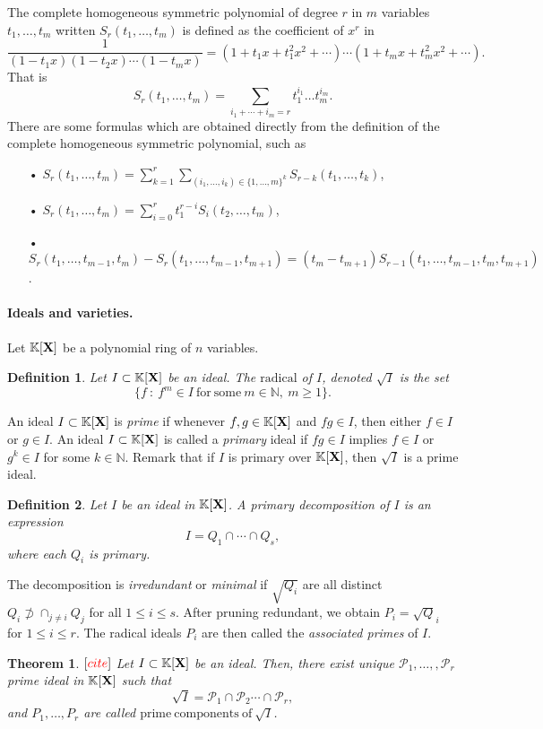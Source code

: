 \documentclass[11pt]{article}
\numberwithin{Property}{section}
\newtheorem{Theorem}{Theorem}%
\numberwithin{Theorem}{section}
\numberwithin{Proposition}{section}
\numberwithin{Lemma}{section}
\numberwithin{Corollary}{section}
\newtheorem{Definition}{Definition}%
\numberwithin{Definition}{section}
\numberwithin{Remark}{section}
\numberwithin{Conjecture}{section}
\numberwithin{Problem}{section}
\numberwithin{Claim}{section}
\theoremstyle{definition}
\numberwithin{Example}{section}
\renewcommand{\leq}{\leqslant}
\renewcommand{\geq}{\geqslant}
\newcommand{\field}{\mathbb{K}} %
\newcommand{\mat}[1]{\mathbf{\MakeUppercase{#1}}} %
\newcommand{\todo}[1]{\textcolor{red}{#1}} %
\begin{document}
The complete homogeneous symmetric polynomial of degree $r$ in $m$ variables $t_1, \ldots, t_m$ written $S_{r}(t_1, \ldots, t_m)$ is defined as the coefficient of $x^{r}$ in $$\frac{1}{(1-t_1x)(1-t_2x)\cdots(1-t_mx)} = (1+t_1x + t_1^2x^2 + \cdots)\cdots(1+t_mx + t_m^2x^2 + \cdots).$$
That is 
\[
S_r(t_1, \ldots, t_m) = \sum_{i_1 + \cdots + i_m = r} t_1^{i_1}\ldots t_m^{i_m}. 
\]
There are some formulas which are obtained directly from the definition of the complete homogeneous symmetric polynomial, such as 
\begin{itemize}
\item[•] $S_{r}(t_1, \ldots, t_m) =  \sum\limits_{k=1}^r\sum\limits_{(i_1, \ldots, i_k) \in \{1, \ldots, m\}^k}S_{r-k}(t_1, \ldots, t_k)$,
\item[•] $S_{r}(t_1, \ldots, t_{m}) = \sum\limits_{i=0}^{r}t_1^{r-i}S_i(t_2, \ldots, t_m)$,
\item[•] $S_r(t_1, \ldots, t_{m-1}, t_m) - S_r(t_1, \ldots, t_{m-1}, t_{m+1}) = (t_m - t_{m+1})S_{r-1}(t_1, \ldots, t_{m-1}, t_m, t_{m+1})$. 
\end{itemize}
\paragraph{Ideals and varieties.} Let $\field[\mat{X}]$ be a polynomial ring of $n$ variables. 
\begin{Definition} Let $I \subset \field[\mat{X}]$ be an ideal. The $\mathrm{radical}$ of $I$, denoted $\sqrt{I}$ is the set 
\[
\{f \ : \ f^m \in I \ \mathrm{for \ some} \ m \in \mathbb{N}, \ m \geq 1\}.
\]
\end{Definition}

An ideal $I \subset \field[\mat{X}]$ is \emph{prime} if whenever $f,g \in \field[\mat{X}]$ and $fg \in I$, then either $f \in I$ or $g \in I$. An ideal $I \subset \field[\mat{X}]$ is called a \emph{primary} ideal if $fg \in I$ implies $f \in I$ or $g^k \in I$ for some $k \in \mathbb{N}$. Remark that if $I$ is primary over $\field[\mat{X}]$, then $\sqrt{I}$ is a prime ideal. 
\begin{Definition}
Let $I$ be an ideal in $\field[\mat{X}]$. A \emph{primary decomposition} of $I$ is an expression 
\[
I = Q_1 \cap \cdots \cap Q_s,
\]
where each $Q_i$ is primary.
\end{Definition}
The decomposition is \emph{irredundant} or \emph{minimal} if $\sqrt{Q_i}$ are all distinct $Q_i \not \supset \cap_{j \ne i}Q_j$ for all $1 \leq i \leq s$. After pruning redundant,  we obtain $P_i = \sqrt{Q}_i$ for $1 \leq i \leq r$. The radical ideals $P_i$ are then called the \emph{associated primes} of $I$. 
\begin{Theorem}$[\todo{cite}]$ Let $I \subset \field[\mat{X}]$ be an ideal. Then, there exist unique $\mathcal{P}_1, \ldots,, \mathcal{P}_r$ prime ideal in $\field[\mat{X}]$ such that 
\[
\sqrt{I} = \mathcal{P}_1 \cap \mathcal{P}_2 \cdots \cap \mathcal{P}_r,
\]
and $P_1, \ldots, P_r$ are called $\mathrm{prime \ components \ of} \ \sqrt{I}$. 
\end{Theorem} 
\end{document}

